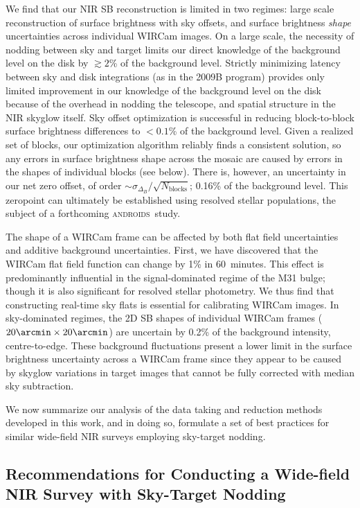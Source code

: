 \documentclass[iop]{emulateapj}
\newcommand{\androids}{\textsc{androids}}
\begin{document}
We find that our NIR SB reconstruction is limited in two regimes: large scale reconstruction of surface brightness with sky offsets, and surface brightness \emph{shape} uncertainties across individual WIRCam images.
On a large scale, the necessity of nodding between sky and target limits our direct knowledge of the background level on the disk by $\gtrsim 2$\% of the background level.
Strictly minimizing latency between sky and disk integrations (as in the 2009B program) provides only limited improvement in our knowledge of the background level on the disk because of the overhead in nodding the telescope, and spatial structure in the NIR skyglow itself.
Sky offset optimization is successful in reducing block-to-block surface brightness differences to $<0.1$\% of the background level.
Given a realized set of blocks, our optimization algorithm reliably finds a consistent solution, so any errors in surface brightness shape across the mosaic are caused by errors in the shapes of individual blocks (see below).
There is, however, an uncertainty in our net zero offset, of order $\sim \sigma_{\Delta_B} / \sqrt{N_\mathrm{blocks}}$; 0.16\% of the background level.
This zeropoint can ultimately be established using resolved stellar populations, the subject of a forthcoming \androids\ study.

The shape of a WIRCam frame can be affected by both flat field uncertainties and additive background uncertainties.
First, we have discovered that the WIRCam flat field function can change by 1\% in 60~minutes.
This effect is predominantly influential in the signal-dominated regime of the M31 bulge; though it is also significant for resolved stellar photometry.
We thus find that constructing real-time sky flats is essential for calibrating WIRCam images.
In sky-dominated regimes, the 2D SB shapes of individual WIRCam frames ($20\arcmin\times20\arcmin$) are uncertain by 0.2\% of the background intensity, centre-to-edge.
These background fluctuations present a lower limit in the surface brightness uncertainty across a WIRCam frame since they appear to be caused by skyglow variations in target images that cannot be fully corrected with median sky subtraction.

We now summarize our analysis of the data taking and reduction methods developed in this work, and in doing so, formulate a set of best practices for similar wide-field NIR surveys employing sky-target nodding.

\subsection{Recommendations for Conducting a Wide-field NIR Survey with Sky-Target Nodding}
\end{document}
